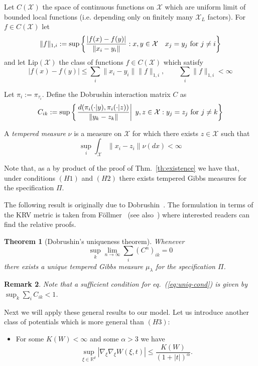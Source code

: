 \documentclass[a4paper,12pt,reqno]{amsart}
\newtheorem{theorem}{Theorem}
\newtheorem{remark}[theorem]{Remark}
\newcommand{\R}{\mathbb{R}}
\newcommand{\X}{\mathcal{X}}
\begin{document}
Let $C(\X)$ the space of continuous functions on $\X$ which are
uniform limit of bounded local functions (i.e. depending only on
finitely many $\X_L$ factors).
For $f \in C(\X)$ let
\begin{equation}
  \label{eq:lip1}
\|f\|_{1,i} :=  \sup \left\{ \frac{|f(x)-f(y)|}{\|x_i-y_i\|} :
 x,y \in\X  \quad \text{$ x_j=y_j$ for $j \neq i$} \right\}  
\end{equation}
and let $\text{Lip}(\X)$ the class of functions $f \in C(\X)$ which satisfy
$$
|f(x)-f(y)| \le \sum_i \|x_i-y_i\| \|f\|_{1,i}, \qquad \sum_i
\|f\|_{1,i} < \infty 
$$

Let $\pi_i := \pi_{\tau_i}$. Define the Dobrushin interaction matrix $C$ as
\begin{equation}
C_{ik} :=
\sup\left\{\left. \frac{d(\pi_{i}(\cdot|y),\pi_{i}(\cdot|z))}{\|y_k-z_k\|}
\right | \; y,z \in\X :  \text{$ y_j=z_j$ for $j \neq k$} \right\}  
\end{equation}


A \emph{tempered measure} $\nu$ is a measure on $\X$ for which  there
exists $z \in \X$ such that
$$
\sup_i \int_{\X} \|x_i-z_i\| \nu(dx) < \infty
$$

Note that, as a by product of the proof of Thm.~\ref{th:existence} we
have that, under conditions $(H1)$ and $(H2)$ there exists tempered  Gibbs
measures for the specification $\Pi$.


The following result is originally due to Dobrushin~\cite{Dobr1,
Dobr2}. The formulation in terms of the KRV metric is taken from
F\"ollmer~\cite{Follmer} (see also~\cite{kuensch}) where interested readers can find the relative proofs.

\begin{theorem}[Dobrushin's uniqueness theorem]
Whenever
\begin{equation}
  \label{eq:uniq-cond}
\sup_k \lim_{n \to \infty} \sum_{i} (C^n)_{ik} = 0  
\end{equation} 
there exists a
unique tempered Gibbs measure $\mu_\lambda$ for the specification $\Pi$.   
\end{theorem}

\begin{remark}
Note that a sufficient condition for eq.~(\ref{eq:uniq-cond}) is given
by $\sup_k \sum_{i} C_{ik} < 1$.   
\end{remark}


Next we will apply these general results to our model.
Let us introduce another class of potentials which is more general
than $(H3)$:
\begin{itemize}
\item[\textbf{(H4)}] For some $K(W) <\infty$ and some $\alpha > 3$ we have
$$
\sup_{\xi \in \R^d} |\nabla_\xi \nabla_\xi W(\xi,t)  |   \le \frac{K(W)}{(1+|t|)^{\alpha}}.
$$
\end{itemize}
\end{document}
